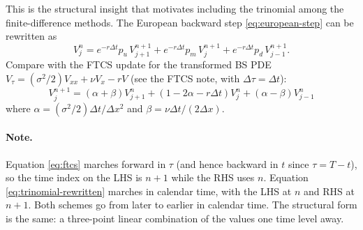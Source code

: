 \documentclass[11pt,a4paper]{article}
\begin{document}
This is the structural insight that motivates including the trinomial
among the finite-difference methods. The European backward step \eqref{eq:european-step} can
be rewritten as
\begin{equation}
V_j^n = e^{-r\Delta t}p_u\,V_{j+1}^{n+1} + e^{-r\Delta t}p_m\,V_j^{n+1} + e^{-r\Delta t}p_d\,V_{j-1}^{n+1}.
\label{eq:trinomial-rewritten}
\end{equation}
Compare with the FTCS update for the transformed BS PDE
$V_\tau = (\sigma^2/2)V_{xx} + \nu V_x - rV$ (see the FTCS note, with $\Delta\tau = \Delta t$):
\begin{equation}
V_j^{n+1} = (\alpha + \beta)V_{j+1}^n + (1 - 2\alpha - r\Delta t)V_j^n + (\alpha - \beta)V_{j-1}^n
\label{eq:ftcs}
\end{equation}
where $\alpha = (\sigma^2/2)\Delta t/\Delta x^2$ and
$\beta = \nu\Delta t/(2\Delta x)$.

\paragraph{Note.} Equation \eqref{eq:ftcs} marches forward in $\tau$
(and hence backward in $t$ since $\tau = T - t$), so the time index
on the LHS is $n+1$ while the RHS uses $n$. Equation
\eqref{eq:trinomial-rewritten} marches in calendar time, with the
LHS at $n$ and RHS at $n+1$. Both schemes go from later to earlier in
calendar time. The structural form is the same: a three-point linear
combination of the values one time level away.
\end{document}
